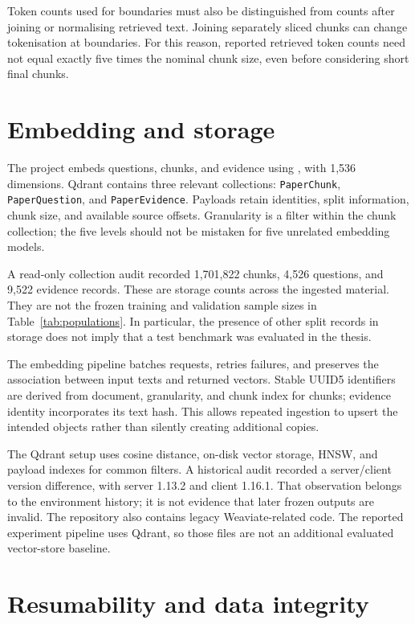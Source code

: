 Token counts used for boundaries must also be distinguished from counts
after joining or normalising retrieved text. Joining separately sliced
chunks can change tokenisation at boundaries. For this reason, reported
retrieved token counts need not equal exactly five times the nominal
chunk size, even before considering short final chunks.

\section{Embedding and storage}
The project embeds questions, chunks, and evidence using
, with 1,536 dimensions. Qdrant contains
three relevant collections: \texttt{PaperChunk},
\texttt{PaperQuestion}, and \texttt{PaperEvidence}. Payloads retain
identities, split information, chunk size, and available source offsets.
Granularity is a filter within the chunk collection; the five levels
should not be mistaken for five unrelated embedding models.

A read-only collection audit recorded 1,701,822 chunks, 4,526 questions,
and 9,522 evidence records. These are storage counts across the ingested
material. They are not the frozen training and validation sample sizes
in Table~\ref{tab:populations}. In particular, the presence of other
split records in storage does not imply that a test benchmark was
evaluated in the thesis.

The embedding pipeline batches requests, retries failures, and preserves
the association between input texts and returned vectors. Stable UUID5
identifiers are derived from document, granularity, and chunk index for
chunks; evidence identity incorporates its text hash. This allows
repeated ingestion to upsert the intended objects rather than silently
creating additional copies.

The Qdrant setup uses cosine distance, on-disk vector storage, HNSW,
and payload indexes for common filters. A historical audit recorded a
server/client version difference, with server 1.13.2 and client 1.16.1.
That observation belongs to the environment history; it is not evidence
that later frozen outputs are invalid. The repository also contains
legacy Weaviate-related code. The reported experiment pipeline uses
Qdrant, so those files are not an additional evaluated vector-store
baseline.

\section{Resumability and data integrity}
